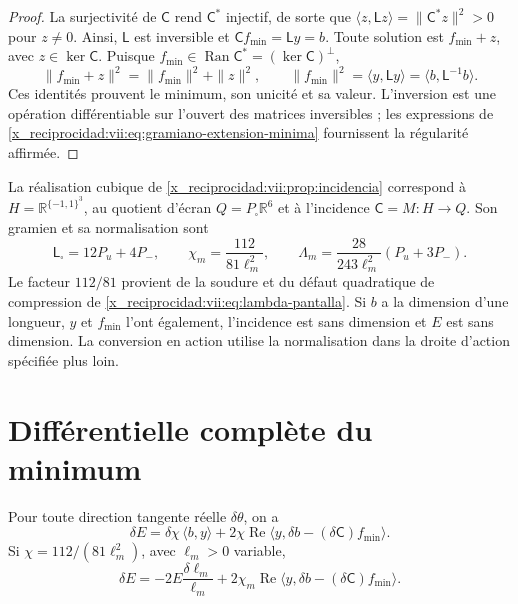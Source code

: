 \begin{proof}
La surjectivité de \(\mathsf C\) rend \(\mathsf C^*\) injectif, de sorte que \(\langle z,\mathsf Lz\rangle=\|\mathsf C^*z\|^2>0\) pour \(z\ne0\). Ainsi, \(\mathsf L\) est inversible et \(\mathsf C f_{\min}=\mathsf L y=b\). Toute solution est \(f_{\min}+z\), avec \(z\in\ker\mathsf C\). Puisque \(f_{\min}\in\operatorname{Ran}\mathsf C^*=(\ker\mathsf C)^\perp\),
\[
 \|f_{\min}+z\|^2=\|f_{\min}\|^2+\|z\|^2,
 \qquad
 \|f_{\min}\|^2=\langle y,\mathsf L y\rangle
 =\langle b,\mathsf L^{-1}b\rangle.
\]
Ces identités prouvent le minimum, son unicité et sa valeur. L'inversion
est une opération différentiable sur l'ouvert des matrices inversibles ;
les expressions de \eqref{x_reciprocidad:vii:eq:gramiano-extension-minima} fournissent
la régularité affirmée.
\end{proof}

La réalisation cubique de \ref{x_reciprocidad:vii:prop:incidencia} correspond à
\(H=\mathbb R^{\{-1,1\}^3}\), au quotient d'écran
\(Q=P_\square\mathbb R^6\) et à l'incidence \(\mathsf C=M:H\to Q\).
Son gramien et sa normalisation sont
\begin{equation}
 \mathsf L_\square=12P_u+4P_-,\qquad
 \chi_m=\frac{112}{81\ell_m^2},\qquad
 \Lambda_m=\frac{28}{243\ell_m^2}(P_u+3P_-).
 \label{x_reciprocidad:vii:eq:normalizacion-minimo-cubico}
\end{equation}
Le facteur \(112/81\) provient de la soudure et du défaut quadratique de compression de \eqref{x_reciprocidad:vii:eq:lambda-pantalla}. Si \(b\) a la dimension d'une longueur, \(y\) et \(f_{\min}\) l'ont également, l'incidence est sans dimension et \(E\) est sans dimension. La conversion en action utilise la normalisation dans la droite d'action spécifiée plus loin.

\section{Différentielle complète du minimum}
\label{x_reciprocidad:vii:subsec:diferencial-minimo}

\begin{theorem}
\label{x_reciprocidad:vii:thm:diferencial-minimo}
Pour toute direction tangente réelle \(\delta\theta\), on a
\begin{equation}
 \delta E
 =\delta\chi\,\langle b,y\rangle
   +2\chi\operatorname{Re}
       \langle y,\delta b-(\delta\mathsf C)f_{\min}\rangle.
 \label{x_reciprocidad:vii:eq:diferencial-minimo-completo}
\end{equation}
Si \(\chi=112/(81\ell_m^2)\), avec \(\ell_m>0\) variable,
\begin{equation}
 \delta E=-2E\frac{\delta\ell_m}{\ell_m}
 +2\chi_m\operatorname{Re}
       \langle y,\delta b-(\delta\mathsf C)f_{\min}\rangle.
 \label{x_reciprocidad:vii:eq:diferencial-minimo-escala}
\end{equation}
\end{theorem}

